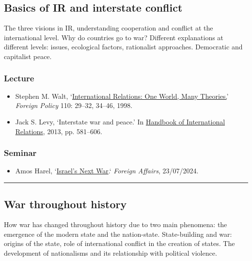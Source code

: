 \documentclass[12pt, a4paper]{article}
\begin{document}
\subsection{Basics of IR and interstate conflict}

The three visions in IR, understanding cooperation and conflict at the international level. Why do countries go to war? Different explanations at different levels: issues, ecological factors, rationalist approaches. Democratic and capitalist peace.

\subsubsection*{Lecture}

\begin{itemize}
\setlength\itemsep{0pt}
\item Stephen M. Walt, `\href{https://doi.org/10.2307/1149275}{International Relations: One World, Many Theories.}' \textit{Foreign Policy} 110: 29--32, 34--46, 1998.
\item Jack S. Levy, `Interstate war and peace.' In \href{https://uk.sagepub.com/en-gb/eur/handbook-of-international-relations/book234093}{Handbook of International Relations}, 2013, pp. 581--606.
\end{itemize}

\subsubsection*{Seminar}

\begin{itemize}
  \item Amos Harel, `\href{https://www.foreignaffairs.com/israel/israels-next-war-hezbollah-lebanon}{Israel’s Next War}.` \textit{Foreign Affairs}, 23/07/2024.
\end{itemize}

\hrule %

\subsection{War throughout history}

How war has changed throughout history due to two main phenomena: the emergence of the modern state and the nation-state. State-building and war: origins of the state, role of international conflict in the creation of states. The development of nationalisms and its relationship with political violence.
\end{document}
